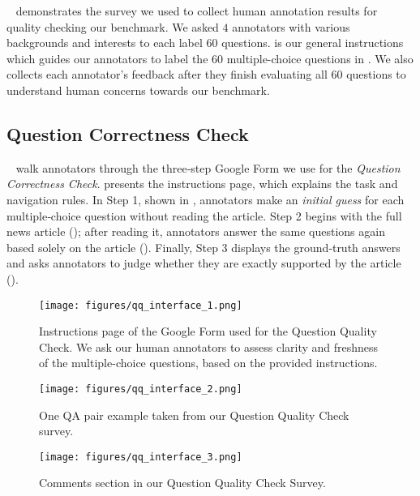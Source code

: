 \documentclass[11pt]{article}
\begin{document}
~ demonstrates the survey we used to collect human annotation results for quality checking our benchmark. 
We asked $4$ annotators with various backgrounds and interests to each label $60$ questions. 
 is our general instructions which guides our annotators to label the $60$ multiple-choice questions in . 
We also collects each annotator's feedback after they finish evaluating all $60$ questions to understand human concerns towards our benchmark.

\subsection{Question Correctness Check}

~
walk annotators through the three‑step Google Form we use for the
\emph{Question Correctness Check}.
 presents the instructions page, which explains the task
and navigation rules.
In Step 1, shown in , annotators make an
\emph{initial guess} for each multiple‑choice question without reading the
article.
Step 2 begins with the full news article (); after
reading it, annotators answer the same questions again based solely on the
article ().
Finally, Step 3 displays the ground‑truth answers and asks annotators to judge
whether they are exactly supported by the article
().

\begin{figure*}
    \centering
    \texttt{[image: figures/qq\_interface\_1.png]}
    \caption{Instructions page of the Google Form used for the Question Quality Check. We ask our human annotators to assess clarity and freshness of the multiple-choice questions, based on the provided instructions.}
    \label{fig:qq_interface_1}
\end{figure*}

\begin{figure*}
    \centering
    \texttt{[image: figures/qq\_interface\_2.png]}
    \caption{One QA pair example taken from our Question Quality Check survey.}
    \label{fig:qq_interface_2}
\end{figure*}

\begin{figure*}
    \centering
    \texttt{[image: figures/qq\_interface\_3.png]}
    \caption{Comments section in our Question Quality Check Survey.}
    \label{fig:qq_interface_3}
\end{figure*}
\end{document}
